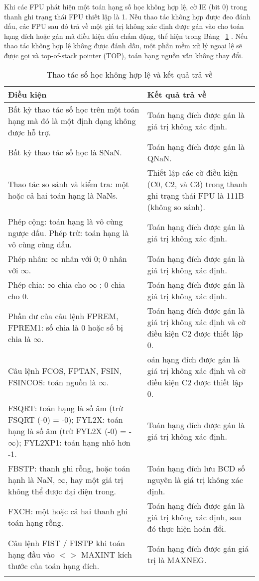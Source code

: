 	Khi các FPU phát hiện một toán hạng số học không hợp lệ, cờ IE (bit 0) trong thanh ghi trạng thái FPU thiết lập là 1. Nếu thao tác không hợp được đeo đánh dấu, các FPU sau đó trả về một giá trị không xác định được gán vào cho toán hạng đích hoặc gán mã điều kiện dấu chấm động, thể hiện trong Bảng ~\ref{tb:InvalidAr} . Nếu thao tác không hợp lệ không được đánh dấu, một phần mềm xử lý ngoại lệ sẽ được gọi và top-of-stack pointer (TOP), toán hạng nguồn vẫn không thay đổi.
		\begin{longtable}{|m{7cm}|m{7cm}|}
			\hline
				Điều kiện & Kết quả trả về\\
			\hline
			\hline
				Bất kỳ thao tác số học trên một toán hạng mà đó là một định dạng không được hỗ trợ. & Toán hạng đích được gán là giá trị không xác định. \\
			\hline
				Bất kỳ thao tác số học là SNaN. & Toán hạng đích được gán là QNaN.\\
			\hline
				Thao tác so sánh và kiểm tra: một hoặc cả hai toán hạng là NaNs. & Thiết lập các cờ điều kiện (C0, C2, và C3) trong thanh ghi trạng thái FPU là 111B (không so sánh). \\
			\hline
				Phép cộng: toán hạng là vô cùng ngược dấu.
				Phép trừ: toán hạng là vô cùng cùng dấu. & Toán hạng đích được gán là giá trị không xác định. \\
			\hline
				Phép nhân: $\mathbb{\infty}  $ nhân với 0; 0 nhân với $\mathbb{\infty}  $. & Toán hạng đích được gán là giá trị không xác định. \\
			\hline
				Phép chia: $\mathbb{\infty}  $ chia cho $\mathbb{\infty}  $ ; 0 chia cho 0. & Toán hạng đích được gán là giá trị không xác định. \\
			\hline
				Phần dư của câu lệnh FPREM, FPREM1: số chia là 0 hoặc số bị chia là  $\mathbb{\infty}  $. &Toán hạng đích được gán là giá trị không xác định và cờ điều kiện C2 được thiết lập 0. \\
			\hline
				Câu lệnh  FCOS, FPTAN, FSIN, FSINCOS: toán nguồn là $\mathbb{\infty}  $. & oán hạng đích được gán là giá trị không xác định và cờ điều kiện C2 được thiết lập 0. \\
			\hline
			FSQRT: toán hạng là số âm (trừ FSQRT (-0) = -0);
			FYL2X: toán hạng là số âm (trừ FYL2X (-0) = -$\mathbb{\infty}  $);
			FYL2XP1: toán hạng nhỏ hơn -1. & Toán hạng đích được gán là giá trị không xác định. \\
			\hline
			FBSTP: thanh ghi rỗng, hoặc toán hạnh là  NaN, $\mathbb{\infty}  $, hay một giá trị không thể được đại diện trong. &  Toán hạng đích lưu BCD số nguyên là giá trị không xác định.\\
			\hline
				FXCH: một hoặc cả hai thanh ghi toán hạng rỗng. &  Toán hạng đích được gán là giá trị không xác định, sau đó thực hiện hoán đổi. \\
			\hline
			Câu lệnh FIST / FISTP khi toán hạng đầu vào $<>$ MAXINT  kích thước của toán hạng đích. & Toán hạng đích được gán giá trị là MAXNEG. \\
			\hline
				\caption{Thao tác số học không hợp lệ và kết quả trả về}
				\label{tb:InvalidAr}
		\end{longtable}
		
